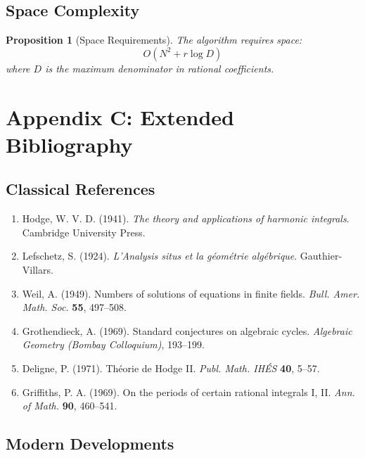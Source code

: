 \documentclass[11pt,a4paper]{article}
\theoremstyle{plain}
\newtheorem{proposition}[theorem]{Proposition}
\theoremstyle{definition}
\theoremstyle{remark}
\begin{document}
\subsection{Space Complexity}

\begin{proposition}[Space Requirements]
The algorithm requires space:
\begin{equation}
O(N^2 + r \log D)
\end{equation}
where $D$ is the maximum denominator in rational coefficients.
\end{proposition}

\section{Appendix C: Extended Bibliography}

\subsection{Classical References}

\begin{enumerate}
\item Hodge, W. V. D. (1941). \emph{The theory and applications of harmonic integrals}. Cambridge University Press.

\item Lefschetz, S. (1924). \emph{L'Analysis situs et la géométrie algébrique}. Gauthier-Villars.

\item Weil, A. (1949). Numbers of solutions of equations in finite fields. \emph{Bull. Amer. Math. Soc.} \textbf{55}, 497--508.

\item Grothendieck, A. (1969). Standard conjectures on algebraic cycles. \emph{Algebraic Geometry (Bombay Colloquium)}, 193--199.

\item Deligne, P. (1971). Théorie de Hodge II. \emph{Publ. Math. IHÉS} \textbf{40}, 5--57.

\item Griffiths, P. A. (1969). On the periods of certain rational integrals I, II. \emph{Ann. of Math.} \textbf{90}, 460--541.
\end{enumerate}

\subsection{Modern Developments}
\end{document}
